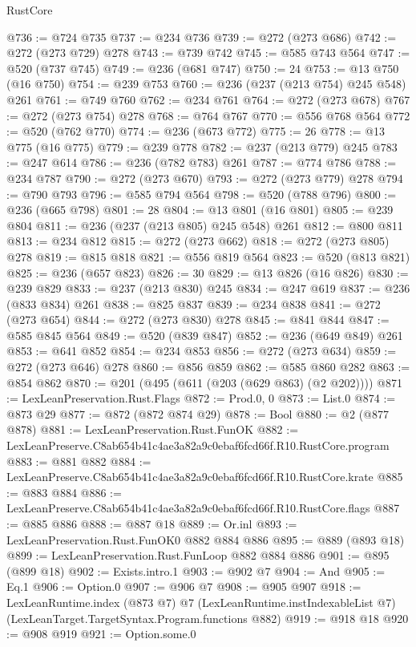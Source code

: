\begin{lexlean}{RustCore}
\begin{coremodule}
@736 := @724 @735
@737 := @234 @736
@739 := @272 (@273 @686)
@742 := @272 (@273 @729) @278
@743 := @739 @742
@745 := @585 @743 @564
@747 := @520 (@737 @745)
@749 := @236 (@681 @747)
@750 := 24
@753 := @13 @750 (@16 @750)
@754 := @239 @753
@760 := @236 (@237 (@213 @754) @245 @548) @261
@761 := @749 @760
@762 := @234 @761
@764 := @272 (@273 @678)
@767 := @272 (@273 @754) @278
@768 := @764 @767
@770 := @556 @768 @564
@772 := @520 (@762 @770)
@774 := @236 (@673 @772)
@775 := 26
@778 := @13 @775 (@16 @775)
@779 := @239 @778
@782 := @237 (@213 @779) @245
@783 := @247 @614
@786 := @236 (@782 @783) @261
@787 := @774 @786
@788 := @234 @787
@790 := @272 (@273 @670)
@793 := @272 (@273 @779) @278
@794 := @790 @793
@796 := @585 @794 @564
@798 := @520 (@788 @796)
@800 := @236 (@665 @798)
@801 := 28
@804 := @13 @801 (@16 @801)
@805 := @239 @804
@811 := @236 (@237 (@213 @805) @245 @548) @261
@812 := @800 @811
@813 := @234 @812
@815 := @272 (@273 @662)
@818 := @272 (@273 @805) @278
@819 := @815 @818
@821 := @556 @819 @564
@823 := @520 (@813 @821)
@825 := @236 (@657 @823)
@826 := 30
@829 := @13 @826 (@16 @826)
@830 := @239 @829
@833 := @237 (@213 @830) @245
@834 := @247 @619
@837 := @236 (@833 @834) @261
@838 := @825 @837
@839 := @234 @838
@841 := @272 (@273 @654)
@844 := @272 (@273 @830) @278
@845 := @841 @844
@847 := @585 @845 @564
@849 := @520 (@839 @847)
@852 := @236 (@649 @849) @261
@853 := @641 @852
@854 := @234 @853
@856 := @272 (@273 @634)
@859 := @272 (@273 @646) @278
@860 := @856 @859
@862 := @585 @860 @282
@863 := @854 @862
@870 := @201 (@495 (@611 (@203 (@629 @863) (@2 @202))))
@871 := LexLeanPreservation.Rust.Flags
@872 := Prod.{0, 0}
@873 := List.{0}
@874 := @873 @29
@877 := @872 (@872 @874 @29)
@878 := Bool
@880 := @2 (@877 @878)
@881 := LexLeanPreservation.Rust.FunOK
@882 := LexLeanPreserve.C8ab654b41c4ae3a82a9c0ebaf6fcd66f.R10.RustCore.program
@883 := @881 @882
@884 := LexLeanPreserve.C8ab654b41c4ae3a82a9c0ebaf6fcd66f.R10.RustCore.krate
@885 := @883 @884
@886 := LexLeanPreserve.C8ab654b41c4ae3a82a9c0ebaf6fcd66f.R10.RustCore.flags
@887 := @885 @886
@888 := @887 @18
@889 := Or.inl
@893 := LexLeanPreservation.Rust.FunOK0 @882 @884 @886
@895 := @889 (@893 @18)
@899 := LexLeanPreservation.Rust.FunLoop @882 @884 @886
@901 := @895 (@899 @18)
@902 := Exists.intro.{1}
@903 := @902 @7
@904 := And
@905 := Eq.{1}
@906 := Option.{0}
@907 := @906 @7
@908 := @905 @907
@918 := LexLeanRuntime.index
    (@873 @7)
    @7
    (LexLeanRuntime.instIndexableList @7)
    (LexLeanTarget.TargetSyntax.Program.functions @882)
@919 := @918 @18
@920 := @908 @919
@921 := Option.some.{0}

\end{coremodule}
\end{lexlean}
